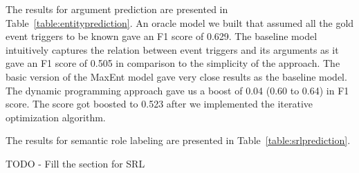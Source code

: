 The results for argument prediction are presented in Table~\ref{table:entityprediction}. An oracle model we built that assumed all the gold event triggers to be known gave an F1 score of 0.629. The baseline model intuitively captures the relation between event triggers and its arguments as it gave an F1 score of 0.505 in comparison to the simplicity of the approach. The basic version of the MaxEnt model gave very close results as the baseline model. The dynamic programming approach gave us a boost of 0.04 (0.60 to 0.64) in F1 score. The score got boosted to 0.523 after we implemented the iterative optimization algorithm.

The results for semantic role labeling are presented in Table~\ref{table:srlprediction}. 

TODO - Fill the section for SRL